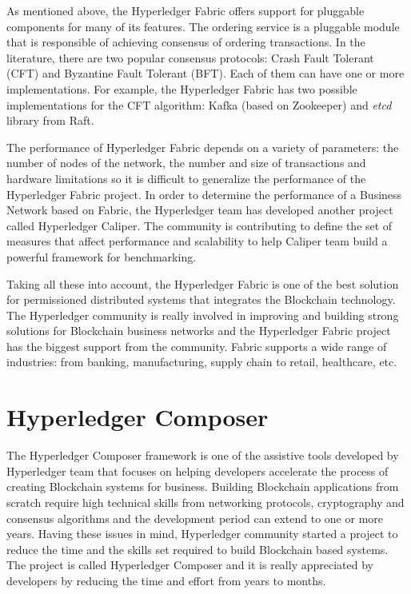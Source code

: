 As mentioned above, the Hyperledger Fabric offers support for pluggable components for many of its features. The ordering service is a pluggable module that is responsible of achieving consensus of ordering transactions. In the literature, there are two popular consensus protocols: Crash Fault Tolerant (CFT) and Byzantine Fault Tolerant (BFT). Each of them can have one or more implementations.
For example, the Hyperledger Fabric has two possible implementations for the CFT algorithm: Kafka (based on Zookeeper) and \emph{etcd} library from Raft.

The performance of Hyperledger Fabric depends on a variety of parameters: the number of nodes of the network, the number and size of transactions and hardware limitations so it is difficult to generalize the performance of the Hyperledger Fabric project. 
In order to determine the performance of a Business Network based on Fabric, the Hyperledger team has developed another project called Hyperledger Caliper. The community is contributing to define the set of measures that affect performance and scalability to help Caliper team build a powerful framework for benchmarking. 

Taking all these into account, the Hyperledger Fabric is one of the best solution for permissioned distributed systems that integrates the Blockchain technology.
The Hyperledger community is really involved in improving and building strong solutions for Blockchain business networks and the Hyperledger Fabric project has the biggest support from the community. Fabric supports a wide range of industries: from banking, manufacturing, supply chain to retail, healthcare, etc.

\section{Hyperledger Composer}
\label{sec:chapter1-section3}
The Hyperledger Composer framework is one of the assistive tools developed by Hyperledger team that focuses on helping developers accelerate the process of creating Blockchain systems for business.
Building Blockchain applications from scratch require high technical skills from networking protocols, cryptography and consensus algorithms and the development period can extend to one or more years. Having these issues in mind, Hyperledger community started a project to reduce the time and the skills set required to build Blockchain based systems. The project is called Hyperledger Composer and it is really appreciated by developers by reducing the time and effort from years to months.


